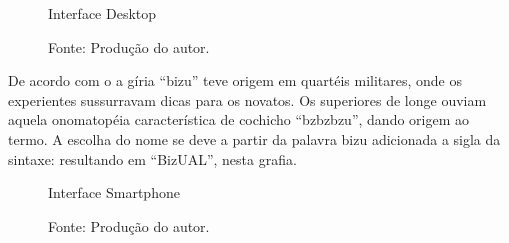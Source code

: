 \begin{figure}[h]
  \caption{Interface Desktop}\label{fig:ui-pc}
  \centering
  \setlength{\fboxsep}{0pt}%
\setlength{\fboxrule}{1pt}%
  \caption*{\footnotesize Fonte: Produção do autor.}
\end{figure}

De acordo com o  a gíria ``bizu'' teve origem em quartéis militares, onde os experientes sussurravam dicas para os novatos. Os superiores de longe ouviam aquela onomatopéia característica de cochicho ``bzbzbzu'', dando origem ao termo. A escolha do nome se deve a partir da palavra bizu adicionada a sigla da sintaxe: resultando em ``BizUAL'', nesta grafia.

\begin{figure}[h]
  \caption{Interface Smartphone}\label{fig:ui-phone}
  \centering
  \setlength{\fboxsep}{0pt}%
\setlength{\fboxrule}{1pt}%
  \caption*{\footnotesize Fonte: Produção do autor.}
\end{figure}

